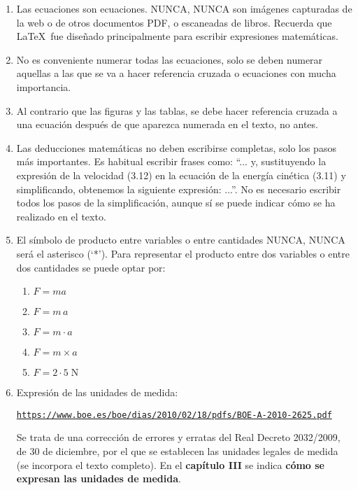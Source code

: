 \documentclass[11pt]{article}
\begin{document}
\begin{enumerate}

    \item Las ecuaciones son ecuaciones. NUNCA, NUNCA son imágenes capturadas de la web o de otros documentos PDF, o escaneadas de libros. Recuerda que \LaTeX\ fue diseñado principalmente para escribir expresiones matemáticas.
    
    \item No es conveniente numerar todas las ecuaciones, solo se deben numerar aquellas a las que se va a hacer referencia cruzada o ecuaciones con mucha importancia.
	
    \item Al contrario que las figuras y las tablas, se debe hacer referencia cruzada a una ecuación después de que aparezca numerada en el texto, no antes.
	
    \item Las deducciones matemáticas no deben escribirse completas, solo los pasos más importantes. Es habitual escribir frases como: ``... y, sustituyendo la expresión de la velocidad (3.12) en la ecuación de la energía cinética (3.11) y simplificando, obtenemos la siguiente expresión: ...''. No es necesario escribir todos los pasos de la simplificación, aunque sí se puede indicar cómo se ha realizado en el texto.
	
    \item El símbolo de producto entre variables o entre cantidades NUNCA, NUNCA será el asterisco (`*'). Para representar el producto entre dos variables o entre dos cantidades se puede optar por:
    
    \begin{enumerate}
        \item $F=ma$
        \item $F=m\,a$
        \item $F=m \cdot a$
        \item $F=m \times a$
        \item $F=2 \cdot 5 \; \unit{\newton}$
    \end{enumerate}
    
    \item Expresión de las unidades de medida:

    \texttt{\url{https://www.boe.es/boe/dias/2010/02/18/pdfs/BOE-A-2010-2625.pdf}}

    Se trata de una corrección de errores y erratas del Real Decreto 2032/2009, de 30 de diciembre, por el que se establecen las unidades legales de medida (se incorpora el texto completo). En el \textbf{capítulo III} se indica \textbf{cómo se expresan las unidades de medida}.
	

\end{enumerate}
\end{document}
